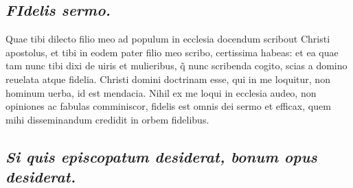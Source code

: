 \documentclass{article}
\begin{document}
\begin{pages}
\subsection*{\textit{\huge\textbf{F}\normalsize Idelis sermo. }}\pstart Quae tibi dilecto filio meo ad populum in ecclesia docendum scribout Christi apostolus, et tibi in eodem pater filio meo scribo, certissima habeas: et ea quae tam nunc tibi dixi de uiris et mulieribus, q̃ nunc scribenda cogito, scias a domino reuelata atque fidelia. Christi domini doctrinam esse, qui in me loquitur, non hominum uerba, id est mendacia. Nihil ex me loqui in ecclesia audeo, non opiniones ac fabulas comminiscor, fidelis est omnis dei sermo et efficax, quem mihi disseminandum credidit in orbem fidelibus.  \pend
{}
{}
\subsection*{\textit{Si quis episcopatum desiderat, bonum opus desiderat. }}

\end{pages}
\end{document}
